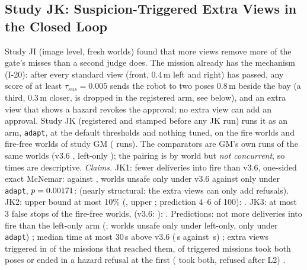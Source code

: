 \subsection{Study JK: Suspicion-Triggered Extra Views in the Closed Loop}\label{sec:moved-jk}
Study JI (image level, fresh worlds) found that more views remove more of the gate's misses than a second judge does. The mission already has the mechanism (I-20): after every standard view (front, 0.4\,m left and right) has passed, any score of at least $\tau_{sus}=0.005$ sends the robot to two poses 0.8\,m beside the bay (a third, 0.3\,m closer, is dropped in the registered arm, see below), and an extra view that shows a hazard revokes the approval; no extra view can add an approval. Study JK (registered and stamped before any JK run) runs it as an arm, \texttt{adapt}, at the default thresholds and nothing tuned, on the \JKWorlds{} fire worlds and \JKPlain{} fire-free worlds of study GM (\JKTrials{} runs). The comparators are GM's own runs of the same worlds (v3.6 \JKV{}, left-only \JKLeft{}); the pairing is by world but \emph{not concurrent}, so times are descriptive.
\emph{Claims.} JK1: fewer deliveries into fire than v3.6, one-sided exact McNemar: \JKAdapt{} against \JKV{}, \JKOnlyV{} worlds unsafe only under v3.6 against \JKOnlyAdapt{} only under \texttt{adapt}, $p=0.00171$: \JKOneHolds{} (nearly structural: the extra views can only add refusals). JK2: upper bound at most 10\% (\JKAdaptRate{}, upper \JKAdaptUpper; prediction 4--6 of 100): \JKTwoHolds. JK3: at most 3 false stops of the fire-free worlds, \JKFalseStops{} (v3.6: \JKFalseStopsV): \JKThreeHolds. Predictions: not more deliveries into fire than the left-only arm (\JKLeft{}; \JKOnlyLeft{} worlds unsafe only under left-only, \JKOnlyAdaptL{} only under \texttt{adapt}) \JKPredOneHolds; median time at most 30\,s above v3.6 (\JKTimeAdapt\,s against \JKTimeV\,s) \JKPredTwoHolds; extra views triggered in \JKTriggerShare{} of the \JKReached{} missions that reached them, \JKAllExtras{} of \JKTriggered{} triggered missions took both poses or ended in a hazard refusal at the first (\JKAllExtras{} took both, \JKRefusedEarly{} refused after L2) \JKPredThreeHolds.

